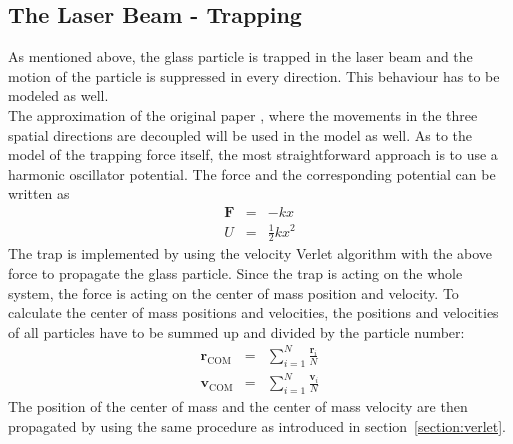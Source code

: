 \documentclass[12pt]{article}
\begin{document}
\subsection{The Laser Beam - Trapping}
As mentioned above, the glass particle is trapped in the laser beam and the motion of the particle is suppressed in every direction. This behaviour
has to be modeled as well.\\
The approximation of the original paper \cite{Gieseler2014}, where the movements in the three spatial directions are decoupled will be
used in the model as well. As to the model of the trapping force itself, the most straightforward approach is to use a harmonic oscillator potential.
The force and the corresponding potential can be written as
\begin{eqnarray}
    \mathbf{F} &=& -k x\\
    U &=& \frac12 k x^2
\end{eqnarray}
The trap is implemented by using the velocity Verlet algorithm with the above force to propagate the glass particle. Since the trap is acting on the
whole system, the force is acting on the center of mass position and velocity. To calculate the center of mass positions and velocities, the positions
and velocities of all particles have to be summed up and divided by the particle number:
\begin{eqnarray}
    \mathbf{r}_\text{COM} &=& \sum_{i=1}^N \frac{\mathbf{r}_i}{N}\\
    \mathbf{v}_\text{COM} &=& \sum_{i=1}^N \frac{\mathbf{v}_i}{N}
\end{eqnarray}
The position of the center of mass and the center of mass velocity are then propagated by using the same procedure as introduced in
section~\ref{section:verlet}.
\end{document}
